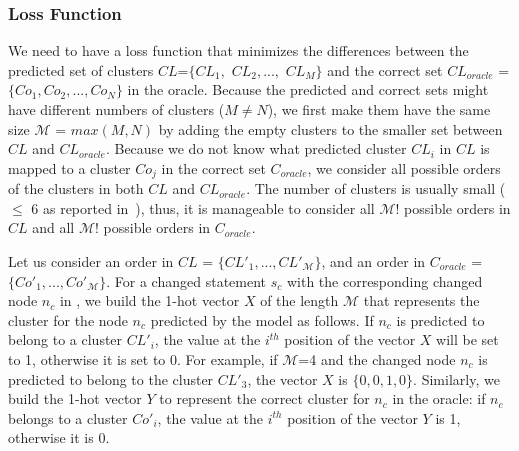 
\subsubsection{{\bf Loss Function}}

We need to have a loss function that minimizes the differences between
the predicted set of clusters $CL$=$\{CL_1,$ $CL_2, ...,$ $CL_M\}$ and
the correct set $CL_{oracle}$ = $\{Co_{1}, Co_{2},..., Co_{N}\}$ in
the oracle. Because the predicted and correct sets might have
different numbers of clusters ($M \neq N$), we first make them have
the same size $\mathcal{M}$ = $max(M,N)$ by adding the empty clusters
to the smaller set between $CL$ and $CL_{oracle}$.
%
Because we do not know what predicted cluster $CL_i$ in $CL$ is mapped
to a cluster $Co_j$ in the correct set $C_{oracle}$, we consider all
possible orders of the clusters in both $CL$ and $CL_{oracle}$.
The number of clusters is usually small ($\leq$ 6 as
reported in~\cite{nguyen-issre13}), thus, it is manageable to consider
all $\mathcal{M}!$ possible orders in $CL$ and all $\mathcal{M}!$
possible orders in $C_{oracle}$.

Let us consider an order in $CL$ = $\{CL'_1,..., CL'_{\mathcal{M}}\}$,
and an order in $C_{oracle}$ = $\{Co'_{1},..., Co'_{\mathcal{M}}\}$.
For a changed statement $s_c$ with the corresponding changed node
$n_c$ in {\mvpdg}, we build the 1-hot vector $X$ of the length
$\mathcal{M}$ that represents the cluster for the node $n_c$ predicted
by the model as follows. If $n_c$ is predicted to belong to a cluster
$CL'_{i}$, the value at the $i^{th}$ position of the vector $X$ will be set
to 1, otherwise it is set to 0. For example, if $\mathcal{M}$=4 and
the changed node $n_c$ is predicted to belong to the cluster $CL'_3$,
the vector $X$ is $\{0,0,1,0\}$.
Similarly, we build the 1-hot vector $Y$ to represent the correct
cluster for $n_c$ in the oracle: if $n_c$ belongs to a cluster
$Co'_{i}$, the value at the $i^{th}$ position of the vector $Y$ is 1,
otherwise it is 0.

